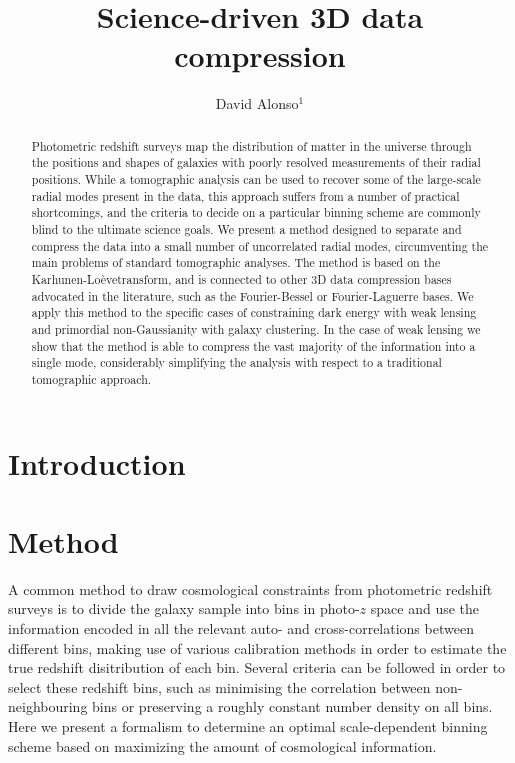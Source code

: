 \documentclass[twocolumn,amsfont,amssymb,amsmath, showpacs,balancelastpage, nofootinbib]{revtex4-1}
\newcommand{\kalo}{Karhunen-Lo\`{e}ve}
\begin{document}
\title{Science-driven 3D data compression}
\author{David Alonso$^1$}

\begin{abstract}
  Photometric redshift surveys map the distribution of matter in the universe through the positions and shapes of galaxies with poorly resolved measurements of their radial positions. While a tomographic analysis can be used to recover some of the large-scale radial modes present in the data, this approach suffers from a number of practical shortcomings, and the criteria to decide on a particular binning scheme are commonly blind to the ultimate science goals. We present a method designed to separate and compress the data into a small number of uncorrelated radial modes, circumventing the main problems of standard tomographic analyses. The method is based on the \kalo transform, and is connected to other 3D data compression bases advocated in the literature, such as the Fourier-Bessel or Fourier-Laguerre bases. We apply this method to the specific cases of constraining dark energy with weak lensing and primordial non-Gaussianity with galaxy clustering. In the case of weak lensing we show that the method is able to compress the vast majority of the information into a single mode, considerably simplifying the analysis with respect to a traditional tomographic approach. \lipsum[0]
\end{abstract}

\maketitle

\section{Introduction}\label{sec:intro}
\lipsum[1]

\section{Method}\label{sec:method}
  A common method to draw cosmological constraints from photometric redshift surveys is to divide the galaxy sample into bins in photo-$z$ space and use the information encoded in all the relevant auto- and cross-correlations between different bins, making use of various calibration methods in order to estimate the true redshift disitribution of each bin. Several criteria can be followed in order to select these redshift bins, such as minimising the correlation between non-neighbouring bins or preserving a roughly constant number density on all bins. Here we present a formalism to determine an optimal scale-dependent binning scheme based on maximizing the amount of cosmological information.
\end{document}
